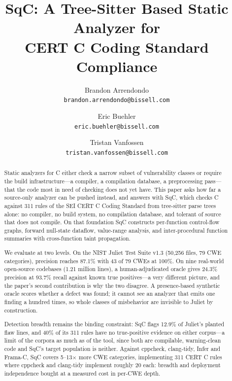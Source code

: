 \documentclass[10pt,twocolumn,letterpaper]{article}
\begin{document}
\title{SqC: A Tree-Sitter Based Static Analyzer for\\CERT C Coding Standard Compliance}

\author{Brandon Arrendondo\\
{\tt\small brandon.arrendondo@bissell.com}
\and
Eric Buehler\\
{\tt\small eric.buehler@bissell.com}
\and
Tristan Vanfossen\\
{\tt\small tristan.vanfossen@bissell.com}
}
\maketitle

\begin{abstract}
Static analyzers for C either check a narrow subset of vulnerability
classes or require the build infrastructure---a compiler, a compilation
database, a preprocessing pass---that the code most in need of checking
does not yet have.  This paper asks how far a source-only analyzer can
be pushed instead, and answers with SqC, which checks C against 311
rules of the SEI CERT C Coding Standard from tree-sitter parse trees
alone: no compiler, no build system, no compilation database, and
tolerant of source that does not compile.  On that foundation SqC
constructs per-function control-flow graphs, forward null-state
dataflow, value-range analysis, and inter-procedural function summaries
with cross-function taint propagation.

We evaluate at two levels.  On the NIST Juliet Test Suite v1.3 (50,256
files, 79 CWE categories), precision reaches 87.1\% with 43 of 79 CWEs
at 100\%.  On nine real-world open-source codebases (1.21 million
lines), a human-adjudicated oracle gives 24.3\% precision at 93.7\%
recall against known true positives---a very different picture, and the
paper's second contribution is why the two disagree.  A presence-based
synthetic oracle scores whether a defect was found; it cannot see an
analyzer that emits one finding a hundred times, so whole classes of
misbehavior are invisible to Juliet by construction.

Detection breadth remains the binding constraint: SqC flags 12.9\% of
Juliet's planted flaw lines, and 40\% of its 311 rules have no
true-positive evidence on either corpus---a limit of the corpora as
much as of the tool, since both are compilable, warning-clean code and
SqC's target population is neither.  Against cppcheck, clang-tidy,
Infer and Frama-C, SqC covers 5--13$\times$ more CWE categories,
implementing 311 CERT C rules where cppcheck and clang-tidy implement
roughly 20 each: breadth and deployment independence bought at a
measured cost in per-CWE depth.
\end{abstract}
\end{document}
